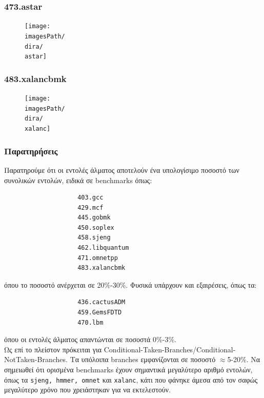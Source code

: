 \documentclass[12pt,a4paper]{article}
\newcommand{\imagesPath}{/home/nick/arch-ntua/ex02/graphs}
\newcommand{\astar}{473.astar.cslab_branch_predictors.out.pdf}
\newcommand{\xalanc}{483.xalancbmk.cslab_branch_predictors.out.pdf}
\newcommand{\dira}{4.1}
\begin{document}
			\subsubsection{473.astar}
				\begin{figure}[H]
					\begin{center}
						\texttt{[image: \\imagesPath/\\dira/\\astar]}
					\end{center}
				\end{figure}
			
			\subsubsection{483.xalancbmk}
				\begin{figure}[H]
					\begin{center}
						\texttt{[image: \\imagesPath/\\dira/\\xalanc]}
					\end{center}
				\end{figure}
		
			\subsubsection{Παρατηρήσεις}
				Παρατηρούμε ότι οι εντολές άλματος αποτελούν ένα υπολογίσιμο ποσοστό των συνολικών εντολών, ειδικά σε benchmarks όπως: 
				
				\begin{verbatim}
					403.gcc
					429.mcf
					445.gobmk
					450.soplex
					458.sjeng
					462.libquantum
					471.omnetpp
					483.xalancbmk
				\end{verbatim}
			
				όπου το ποσοστό ανέρχεται σε 20\%-30\%. Φυσικά υπάρχουν και εξαιρέσεις, όπως τα:
				
				\begin{verbatim}
					436.cactusADM
					459.GemsFDTD
					470.lbm
				\end{verbatim}
			
				όπου οι εντολές άλματος απαντώνται σε ποσοστά 0\%-3\%. \\
				
				Ως επί το πλείστον πρόκειται για Conditional-Taken-Branches/Conditional-NotTaken-Branches. Τα υπόλοιπα branches εμφανίζονται σε ποσοστό $\approx$5-20\%. Να σημειωθεί ότι ορισμένα benchmarks έχουν σημαντικά μεγαλύτερο αριθμό εντολών, όπως τα \verb|sjeng, hmmer, omnet| και \verb|xalanc|, κάτι που φάνηκε άμεσα από τον σαφώς μεγαλύτερο χρόνο που χρειάστηκαν για να εκτελεστούν.			
				
\end{document}
